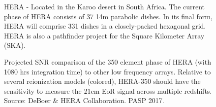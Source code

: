 \documentclass[a0,landscape]{a0poster}
\begin{document}
\begin{multicols}{4}
\begin{figure}[H]
\centering
\label{fig:HERA}
\caption{HERA - Located in the Karoo desert in South Africa. The current phase of HERA consists of 37 14m parabolic dishes. In its final form, HERA will comprise 331 dishes in a closely-packed hexagonal grid. HERA is also a pathfinder project for the Square Kilometer Array (SKA).}
\end{figure}

\begin{figure}[H]
\centering
{}
\caption{Projected SNR comparison of the 350 element phase of HERA (with 1080 hrs integration time) to other low frequency arrays. Relative to several reionization models (colored), HERA-350
should have the sensitivity to measure the 21cm EoR signal across multiple redshifts. Source: DeBoer \& HERA Collaboration. PASP 2017.}
\label{fig:HERAsense}
\end{figure}


\end{multicols}
\end{document}

